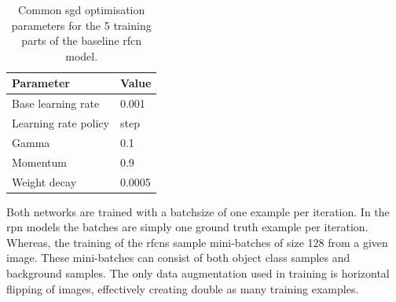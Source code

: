\begin{table}[h]
\centering
\caption{Common \gls{sgd} optimisation parameters for the 5 training parts of the baseline \gls{rfcn} model.}
\label{tab:trainparams}
\begin{tabular}{|l|l|}
\hline
\textbf{Parameter}            & \textbf{Value}  \\ \hline
Base learning rate   & 0.001  \\ \hline
Learning rate policy & step   \\ \hline
Gamma                & 0.1    \\ \hline
Momentum             & 0.9    \\ \hline
Weight decay         & 0.0005 \\ \hline
\end{tabular}
\end{table}

 Both networks are trained with a batchsize of one example per iteration. In the \gls{rpn} models the batches are simply one ground truth example per iteration. Whereas, the training of the \glspl{rfcn} sample mini-batches of size 128 from a given image. These mini-batches can consist of both object class samples and background samples. 
 The only data augmentation used in training is horizontal flipping of images, effectively creating double as many training examples.


